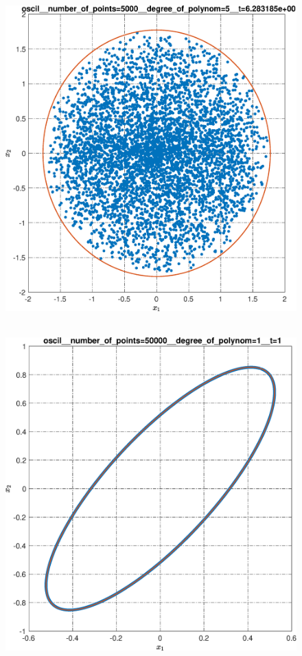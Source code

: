 \documentclass[../main.tex]{subfiles}
\begin{document}
\begin{figure}[ht!]
\begin{minipage}[b]{.3\linewidth}
  	\end{minipage} 
  	\vfill
  	\hspace{-2.5ex}
  	\begin{minipage}[b]{.3\linewidth} 
  		\small
  		\centering 
  		\includegraphics[width=\linewidth]{images/oscil__number_of_points=5000__degree_of_polynom=5__t=2pi.eps}
  	\end{minipage}
  	\hfill
  	\begin{minipage}[b]{.3\linewidth} 
  		\small
  		\centering
  		\includegraphics[width=\linewidth]{images/oscil__number_of_points=50000__degree_of_polynom=1__t=1.eps}

\end{minipage}
\end{figure}
\end{document}
